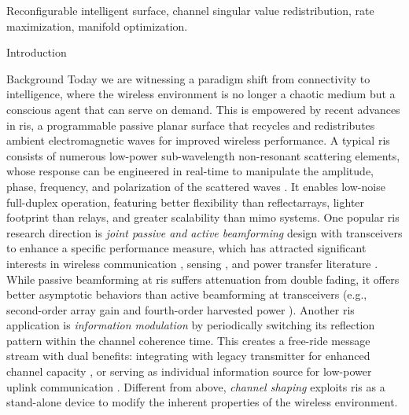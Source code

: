 \documentclass[journal]{IEEEtran}
\begin{document}
\begin{IEEEkeywords}
	Reconfigurable intelligent surface, channel singular value redistribution, rate maximization, manifold optimization.
\end{IEEEkeywords}

\glsresetall

\begin{section}{Introduction}
	\begin{subsection}{Background}
		Today we are witnessing a paradigm shift from connectivity to intelligence, where the wireless environment is no longer a chaotic medium but a conscious agent that can serve on demand.
		This is empowered by recent advances in \gls{ris}, a programmable passive planar surface that recycles and redistributes ambient electromagnetic waves for improved wireless performance.
		A typical \gls{ris} consists of numerous low-power sub-wavelength non-resonant scattering elements, whose response can be engineered in real-time to manipulate the amplitude, phase, frequency, and polarization of the scattered waves \cite{Basar2019}.
		It enables low-noise full-duplex operation, featuring better flexibility than reflectarrays, lighter footprint than relays, and greater scalability than \gls{mimo} systems.
		One popular \gls{ris} research direction is \emph{joint passive and active beamforming} design with transceivers to enhance a specific performance measure, which has attracted significant interests in wireless communication \cite{Wu2019,Guo2020,Liu2022}, sensing \cite{He2022,Luo2022,Hua2023}, and power transfer literature \cite{Wu2020a,Feng2022,Zhao2022}.
		While passive beamforming at \gls{ris} suffers attenuation from double fading, it offers better asymptotic behaviors than active beamforming at transceivers (e.g., second-order array gain and fourth-order harvested power \cite{Zhao2022}).
		Another \gls{ris} application is \emph{information modulation} by periodically switching its reflection pattern within the channel coherence time.
		This creates a free-ride message stream with dual benefits: integrating with legacy transmitter for enhanced channel capacity \cite{Karasik2020,Basar2020,Ye2022}, or serving as individual information source for low-power uplink communication \cite{Liang2020,Zhao2024,Yang2024}.
		Different from above, \emph{channel shaping} exploits \gls{ris} as a stand-alone device to modify the inherent properties of the wireless environment.

\end{subsection}
\end{section}
\end{document}
